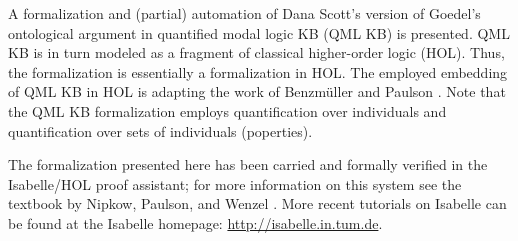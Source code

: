 %
\begin{isabellebody}%
\def\isabellecontext{GoedelGod}%
%
\isadelimtheory
%
\endisadelimtheory
%
\isatagtheory
%
\endisatagtheory
{\isafoldtheory}%
%
\isadelimtheory
%
\endisadelimtheory
%
\isamarkuptrue%
%
\begin{isamarkuptext}%
A formalization and (partial) automation of Dana Scott's version \cite{ScottNotes}
 of Goedel's ontological argument \cite{GoedelNotes} in quantified modal logic KB (QML KB) is presented. 
 QML KB is in turn modeled as a fragment of classical higher-order logic (HOL). 
 Thus, the formalization is essentially a formalization in HOL. The employed embedding 
 of QML KB in HOL is adapting the work of Benzm\"uller and Paulson \cite{J23,B9}.
 Note that the QML KB formalization employs quantification over individuals and 
 quantification over sets of individuals (poperties).

 The formalization presented here has been carried and formally verified in the Isabelle/HOL 
 proof assistant; for more information on this system see the textbook by Nipkow, 
 Paulson, and Wenzel \cite{Isabelle}. More recent tutorials on Isabelle can be found 
 at the Isabelle homepage: \url{http://isabelle.in.tum.de}.
 


\end{isamarkuptext}
\end{isabellebody}
